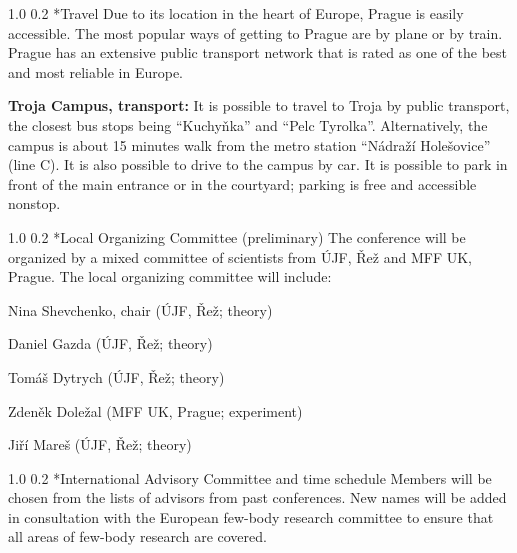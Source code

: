 \documentclass[12pt]{extarticle}
\makeatletter
\renewcommand{\section}{\@startsection{section}{1}{0mm}
{1.0\baselineskip}%
{0.2\baselineskip}%
{\normalfont\large\bfseries}}%
\newcommand*\sq{\mathbin{\vcenter{\hbox{\rule{.8ex}{.8ex}}}}}
\newenvironment{t_sq_itemize}
{\begin{itemize}[topsep=0pt, parsep=0pt, itemsep=0pt, leftmargin=*]
    \renewcommand{\labelitemi}{{\(\sq\)}}}
  {\end{itemize}}
\makeatother
\begin{document}
\section*{Travel}
\noindent
%
Due to its location in the heart of Europe, Prague is easily
accessible. The most popular ways of getting to Prague are by plane or
by train. Prague has an extensive public transport network that is
rated as one of the best and most reliable in Europe.

{\bf Troja Campus, transport:} It is possible to travel to Troja by public transport, the closest bus stops being “Kuchyňka”
and “Pelc Tyrolka”. Alternatively, the campus is about 15 minutes walk from the metro station “Nádraží Holešovice”
(line C). It is also possible to drive to the campus by car. It is possible to park in front of the main entrance or in the courtyard;
parking is free and accessible nonstop.


\section*{Local Organizing Committee (preliminary)}
\noindent
The conference will be organized by a mixed committee of scientists from ÚJF, Řež and MFF UK, Prague.
The local organizing committee will include:
\begin{t_sq_itemize}
\item Nina Shevchenko, chair (ÚJF, Řež; theory)
\item Daniel Gazda (ÚJF, Řež; theory)
\item Tomáš Dytrych (ÚJF, Řež; theory)
\item Zdeněk Doležal (MFF UK, Prague; experiment)
\item Jiří Mareš (ÚJF, Řež; theory) 
\end{t_sq_itemize}

\section*{International Advisory Committee and time schedule}
\noindent
%
Members will be chosen from the lists of advisors from past conferences. New names
will be added in consultation with the European few-body research committee to ensure that all
areas of few-body research are covered. 
\end{document}
